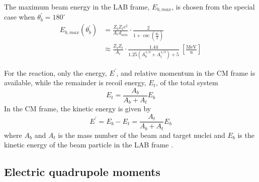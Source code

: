 \documentclass[twoside,english]{uiofysmaster/uiofysmaster}
\newcommand{\Sm}{$^{140}$Sm} %
\newcommand{\Pb}{$^{208}$Pb}
\begin{document}
The maximum beam energy in the LAB frame, $E_{b, max}$, is chosen from the special case when $\theta_b^{'} = 180^\circ$ \cite{Klintefjord, RBass}
\begin{align}
	E_{b, max} (\theta_b^{'})
	&= \frac{Z_b Z_t e^2}{A_r d_{min}} \cdot \frac{2}{1 + \csc \left( \frac{\theta_b^{'}}{2} \right)} \\
	&\approx \frac{Z_b Z_t}{A_r} \cdot \frac{1.44}{1.25 (A_b^{1/3} + A_t^{1/3}) + 5} ~\left[ \tfrac{\text{MeV}}{\text{u}} \right]
\end{align}


For the reaction, only the energy, $E^{'}$, and relative momentum in the CM frame is available, while the remainder is recoil energy, $E_t$, of the total system
\begin{equation}
	E_t = \frac{A_b}{A_b + A_t} E_b
\end{equation}
In the CM frame, the kinetic energy is given by
\begin{equation}
	E^{'} = E_b - E_t = \frac{A_t}{A_b + A_t} E_{b}
\end{equation}
where $A_b$ and $A_t$ is the mass number of the beam and target nuclei and $E_{b}$ is the kinetic energy of the beam particle in the LAB frame \cite{Niedermaier, NaR}.


\subsection{Electric quadrupole moments}
\end{document}
